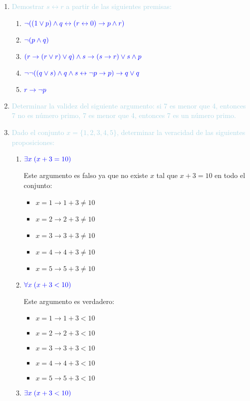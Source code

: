 \documentclass[12pt]{article}
\newcommand{\lb}[1]{\textcolor{lightblue}{#1}}
\newcommand{\db}[1]{\textcolor{blue}{#1}}
\begin{document}
\begin{enumerate}[label=\color{red}\textbf{\arabic*)}, leftmargin=*]
\begin{enumerate}[label=\color{red}\alph*)]
      \end{enumerate}
      \item \lb{Demostrar $s\leftrightarrow r$ a partir de las siguientes premisas:}
      \begin{enumerate}[label=\color{red}\alph*)]
            \item $\db{\neg((1\vee p)\wedge q\leftrightarrow(r\leftrightarrow0)\to p\wedge r)}$
            \item $\db{\neg(p\wedge q)}$
            \item $\db{(r\to(r\vee r)\vee q)\wedge s\to(s\to r)\vee s\wedge p}$
            \item $\db{\neg\neg((q\vee s)\wedge q\wedge s\leftrightarrow\neg p\to p)\to q\vee q}$
            \item $\db{r\to\neg p}$
      \end{enumerate}
      \item \lb{Determinar la validez del siguiente argumento: si 7 es menor que 4, entonces 7 no es número primo, 7 es menor que 4, entonces 7 es un número primo.}
      \item \lb{Dado el conjunto $x=\{1,2,3,4,5\}$, determinar la veracidad de las siguientes proposiciones:}
      \begin{enumerate}[label=\color{red}\alph*)]
            \item $\db{\exists x\;(x+3=10)}$
            
            Este argumento es falso ya que no existe $x$ tal que $x+3=10$ en todo el conjunto:
            \begin{itemize}[label=$-$]
                  \item $x=1\longrightarrow 1+3\neq10$
                  \item $x=2\longrightarrow 2+3\neq10$
                  \item $x=3\longrightarrow 3+3\neq10$
                  \item $x=4\longrightarrow 4+3\neq10$
                  \item $x=5\longrightarrow 5+3\neq10$
            \end{itemize}
            \item $\db{\forall x\;(x+3<10)}$
            
            Este argumento es verdadero:
            \begin{itemize}[label=$-$]
                  \item $x=1\longrightarrow 1+3<10$
                  \item $x=2\longrightarrow 2+3<10$
                  \item $x=3\longrightarrow 3+3<10$
                  \item $x=4\longrightarrow 4+3<10$
                  \item $x=5\longrightarrow 5+3<10$
            \end{itemize}
            \item $\db{\exists x\;(x+3<10)}$
            

\end{enumerate}
\end{enumerate}
\end{document}
